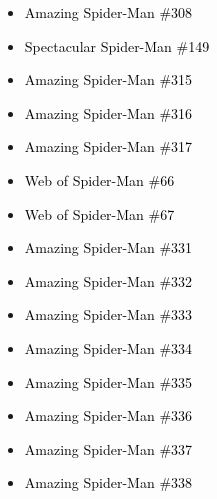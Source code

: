 \documentclass[12pt]{article}
\newcommand{\checkbox}{\raisebox{0.0ex}{\fbox{\rule{0ex}{1.5ex} \rule{1.5ex}{0ex}}}}
\begin{document}
\begin{center}
\begin{tcolorbox}[colback=white!95!gray, colframe=black, width=0.9\textwidth, arc=4mm, auto outer arc, boxrule=0.8pt]
\begin{itemize}[left=0pt,label={\checkbox}]
    \item \textcolor{black}{Amazing Spider-Man \#308}
    \item \textcolor{black}{Spectacular Spider-Man \#149}
    \item \textcolor{black}{Amazing Spider-Man \#315}
    \item \textcolor{black}{Amazing Spider-Man \#316}
    \item \textcolor{black}{Amazing Spider-Man \#317}
    \item \textcolor{black}{Web of Spider-Man \#66}
    \item \textcolor{black}{Web of Spider-Man \#67}
    \item \textcolor{black}{Amazing Spider-Man \#331}
    \item \textcolor{black}{Amazing Spider-Man \#332}
    \item \textcolor{black}{Amazing Spider-Man \#333}
    \item \textcolor{black}{Amazing Spider-Man \#334}
    \item \textcolor{black}{Amazing Spider-Man \#335}
    \item \textcolor{black}{Amazing Spider-Man \#336}
    \item \textcolor{black}{Amazing Spider-Man \#337}
    \item \textcolor{black}{Amazing Spider-Man \#338}
\end{itemize}
\end{tcolorbox}
\end{center}
\end{document}
